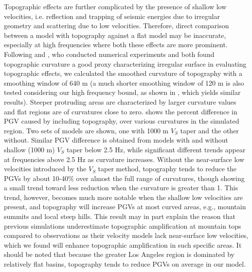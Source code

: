 Topographic effects are further complicated by the presence of shallow low velocities, i.e. reflection and trapping of seismic energies due to irregular geometry and scattering due to low velocities. Therefore, direct comparison between a model with topography against a flat model may be inaccurate, especially at high frequencies where both these effects are more prominent. Following \citet{maufroyFrequencyScaledCurvature2015} and \citet{raiEmpiricalTerrainBasedTopographic2017}, who conducted numerical experiments and both found topographic curvature a good proxy characterizing irregular surface in evaluating topographic effects, we calculated the smoothed curvature of topography with a smoothing window of 640 m (a much shorter smoothing window of 120 m is also tested considering our high frequency bound, as shown in , which yields similar results). Steeper protruding areas are characterized by larger curvature values and flat regions are of curvatures close to zero.  shows the percent difference in PGV caused by including topography, over various curvatures in the simulated region. Two sets of models are shown, one with 1000 m $V_S$ taper and the other without. Similar PGV difference is obtained from models with and without shallow (1000 m) $V_S$ taper below 2.5 Hz, while significant different trends appear at frequencies above 2.5 Hz as curvature increases. Without the near-surface low velocities introduced by the $V_S$ taper method, topography tends to reduce the PGVs by about 10-40\% over almost the full range of curvatures, though showing a small trend toward less reduction when the curvature is greater than 1. This trend, however, becomes much more notable when the shallow low velocities are present, and topography will increase PGVs at most curved areas, e.g., mountain summits and local steep hills. This result may in part explain the reason that previous simulations underestimate topographic amplification at mountain tops compared to observations  as their velocity models lack near-surface low velocities, which we found will enhance topographic amplification in such specific areas. It should be noted that because the greater Los Angeles region is dominated by relatively flat basins, topography tends to reduce PGVs on average in our model. 


